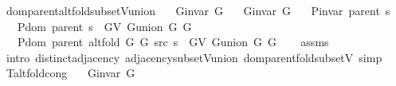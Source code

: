 \begin{isabellebody}
\isanewline
{}\isamarkupfalse%
\ dom{\isacharunderscore}{\kern0pt}parent{\isacharunderscore}{\kern0pt}alt{\isacharunderscore}{\kern0pt}fold{\isacharunderscore}{\kern0pt}subset{\isacharunderscore}{\kern0pt}V{\isacharunderscore}{\kern0pt}union{\isacharcolon}{\kern0pt}\isanewline
\ \ \ {\isachardoublequoteopen}G{\isachardot}{\kern0pt}invar\ G{}{\isachardoublequoteclose}\isanewline
\ \ \ {\isachardoublequoteopen}G{\isachardot}{\kern0pt}invar\ G{}{\isachardoublequoteclose}\isanewline
\ \ \ {\isachardoublequoteopen}P{\isacharunderscore}{\kern0pt}invar\ {\isacharparenleft}{\kern0pt}parent\ s{\isacharparenright}{\kern0pt}{\isachardoublequoteclose}\isanewline
\ \ \ {\isachardoublequoteopen}P{\isachardot}{\kern0pt}dom\ {\isacharparenleft}{\kern0pt}parent\ s{\isacharparenright}{\kern0pt}\ {\isasymsubseteq}\ G{\isachardot}{\kern0pt}V\ {\isacharparenleft}{\kern0pt}G{\isachardot}{\kern0pt}union\ G{}\ G{}{\isacharparenright}{\kern0pt}{\isachardoublequoteclose}\isanewline
\ \ \ {\isachardoublequoteopen}P{\isachardot}{\kern0pt}dom\ {\isacharparenleft}{\kern0pt}parent\ {\isacharparenleft}{\kern0pt}alt{\isacharunderscore}{\kern0pt}fold\ G{}\ G{}\ src\ s{\isacharparenright}{\kern0pt}{\isacharparenright}{\kern0pt}\ {\isasymsubseteq}\ G{\isachardot}{\kern0pt}V\ {\isacharparenleft}{\kern0pt}G{\isachardot}{\kern0pt}union\ G{}\ G{}{\isacharparenright}{\kern0pt}{\isachardoublequoteclose}\isanewline
%
\isadelimproof
\ \ %
\endisadelimproof
%
\isatagproof
{}\isamarkupfalse%
\ assms\isanewline
\ \ \isamarkupfalse%
\ {\isacharparenleft}{\kern0pt}intro\ distinct{\isacharunderscore}{\kern0pt}adjacency\ adjacency{\isacharunderscore}{\kern0pt}subset{\isacharunderscore}{\kern0pt}V{\isacharunderscore}{\kern0pt}union\ dom{\isacharunderscore}{\kern0pt}parent{\isacharunderscore}{\kern0pt}fold{\isacharunderscore}{\kern0pt}subset{\isacharunderscore}{\kern0pt}V{\isacharparenright}{\kern0pt}\ simp{\isacharplus}{\kern0pt}%
\endisatagproof
{\isafoldproof}%
%
\isadelimproof
%
\endisadelimproof
%
\isadelimdocument
%
\endisadelimdocument
%
\isatagdocument
%
\isamarkuptrue%
%
\endisatagdocument
{\isafolddocument}%
%
\isadelimdocument
%
\endisadelimdocument
{}\isamarkupfalse%
\ T{\isacharunderscore}{\kern0pt}alt{\isacharunderscore}{\kern0pt}fold{\isacharunderscore}{\kern0pt}cong{\isacharcolon}{\kern0pt}\isanewline
\ \ \ {\isachardoublequoteopen}G{\isachardot}{\kern0pt}invar\ G{}{\isachardoublequoteclose}\isanewline

\end{isabellebody}
